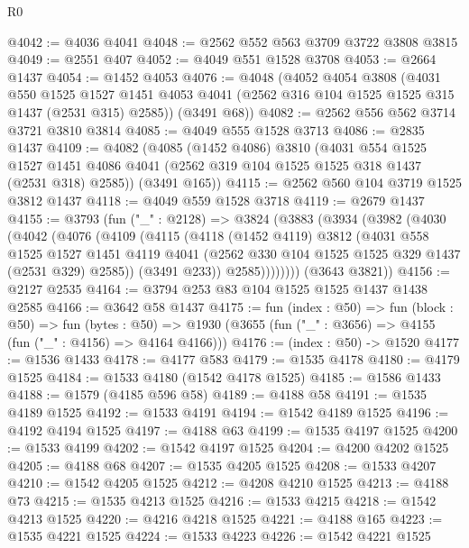 \begin{lexlean}{R0}
\begin{coremodule}
@4042 := @4036 @4041
@4048 := @2562 @552 @563 @3709 @3722 @3808 @3815
@4049 := @2551 @407
@4052 := @4049 @551 @1528 @3708
@4053 := @2664 @1437
@4054 := @1452 @4053
@4076 := @4048
    (@4052
      @4054
      @3808
      (@4031
        @550
        @1525
        @1527
        @1451
        @4053
        @4041
        (@2562 @316 @104 @1525 @1525 @315 @1437 (@2531 @315) @2585))
      (@3491 @68))
@4082 := @2562 @556 @562 @3714 @3721 @3810 @3814
@4085 := @4049 @555 @1528 @3713
@4086 := @2835 @1437
@4109 := @4082
    (@4085
      (@1452 @4086)
      @3810
      (@4031
        @554
        @1525
        @1527
        @1451
        @4086
        @4041
        (@2562 @319 @104 @1525 @1525 @318 @1437 (@2531 @318) @2585))
      (@3491 @165))
@4115 := @2562 @560 @104 @3719 @1525 @3812 @1437
@4118 := @4049 @559 @1528 @3718
@4119 := @2679 @1437
@4155 := @3793
    (fun ("_" : @2128) =>
    @3824
      (@3883
        (@3934
          (@3982
            (@4030
              (@4042
                (@4076
                  (@4109
                    (@4115
                      (@4118
                        (@1452 @4119)
                        @3812
                        (@4031
                          @558
                          @1525
                          @1527
                          @1451
                          @4119
                          @4041
                          (@2562 @330 @104 @1525 @1525 @329 @1437 (@2531 @329) @2585))
                        (@3491 @233))
                      @2585))))))))
      (@3643 @3821))
@4156 := @2127 @2535
@4164 := @3794 @253 @83 @104 @1525 @1525 @1437 @1438 @2585
@4166 := @3642 @58 @1437
@4175 := fun (index : @50) =>
  fun (block : @50) =>
  fun (bytes : @50) => @1930 (@3655 (fun ("_" : @3656) => @4155 (fun ("_" : @4156) => @4164 @4166)))
@4176 := (index : @50) -> @1520
@4177 := @1536 @1433
@4178 := @4177 @583
@4179 := @1535 @4178
@4180 := @4179 @1525
@4184 := @1533 @4180 (@1542 @4178 @1525)
@4185 := @1586 @1433
@4188 := @1579 (@4185 @596 @58)
@4189 := @4188 @58
@4191 := @1535 @4189 @1525
@4192 := @1533 @4191
@4194 := @1542 @4189 @1525
@4196 := @4192 @4194 @1525
@4197 := @4188 @63
@4199 := @1535 @4197 @1525
@4200 := @1533 @4199
@4202 := @1542 @4197 @1525
@4204 := @4200 @4202 @1525
@4205 := @4188 @68
@4207 := @1535 @4205 @1525
@4208 := @1533 @4207
@4210 := @1542 @4205 @1525
@4212 := @4208 @4210 @1525
@4213 := @4188 @73
@4215 := @1535 @4213 @1525
@4216 := @1533 @4215
@4218 := @1542 @4213 @1525
@4220 := @4216 @4218 @1525
@4221 := @4188 @165
@4223 := @1535 @4221 @1525
@4224 := @1533 @4223
@4226 := @1542 @4221 @1525

\end{coremodule}
\end{lexlean}
